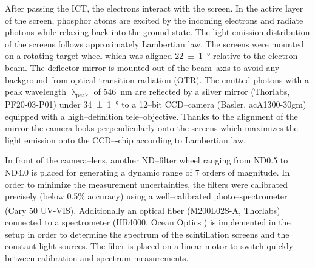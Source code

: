 \documentclass[%
preprint,
amsmath,
amssymb,
aip,
rsi, 
numerical,
floatfix,
]{revtex4-1}
\newcommand{\myCite}[1]{\textcolor{blue}{\cite{#1}}}
\begin{document}
After passing the ICT, the electrons interact with the screen. 
In the active layer of the screen, phosphor atoms are excited by the incoming electrons and radiate photons while relaxing back into the ground state.
The light emission distribution of the screens follows approximately Lambertian law\myCite{Giakoumakis1985}. 
The screens were mounted on a rotating target wheel which was aligned \SI[separate-uncertainty = true]{22(1)}{\degree} relative to the electron beam.
The deflector mirror is mounted out of the beam--axis to avoid any background from optical transition radiation (OTR).  
The emitted photons with a peak wavelength $\uplambda_{\text{peak}}$ of \SI{546}{\nano\metre} are reflected by a silver mirror (Thorlabs, PF20-03-P01) under \SI[separate-uncertainty = true]{34(1)}{\degree} to a 12–bit CCD–camera (Basler, acA1300-30gm) equipped with a high--definition tele--objective. 
Thanks to the alignment of the mirror the camera looks perpendicularly onto the screens which maximizes the light emission onto the CCD–-chip according to Lambertian law.
 
In front of the camera--lens, another ND--filter wheel ranging from ND0.5 to ND4.0 is placed for generating a dynamic range of 7 orders of magnitude. 
In order to minimize the measurement uncertainties, the filters were calibrated precisely (below 0.5$\%$ accuracy) using a well--calibrated photo--spectrometer (Cary\textsuperscript{\textregistered} 50 UV-VIS).
Additionally an optical fiber (M200L02S-A, Thorlabs) connected to a spectrometer (HR4000, Ocean Optics ) is implemented in the setup in order to determine the spectrum of the scintillation screens and the constant light sources.
The fiber is placed on a linear motor to switch quickly between calibration and spectrum measurements. 
 
\end{document}
